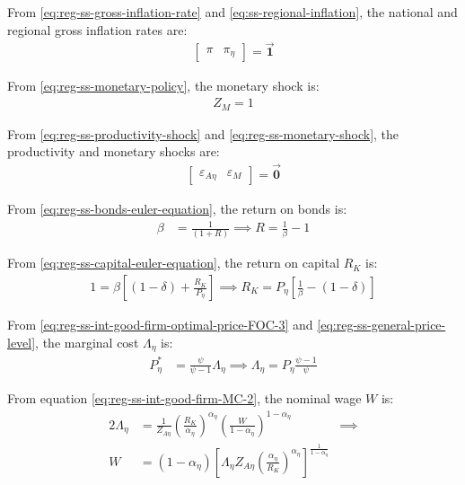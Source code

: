 \documentclass[
thesis.tex
]{subfiles}
\begin{document}
From \ref{eq:reg-ss-gross-inflation-rate} and \ref{eq:ss-regional-inflation}, the national and regional gross inflation rates are:
\begin{align}
	\begin{bmatrix}
		\pi & \pi_{\eta}
	\end{bmatrix} = \vec{\bm{1}}
\end{align}

From \ref{eq:reg-ss-monetary-policy}, the monetary shock is:
\begin{align}
	Z_{M} = 1
\end{align}

From \ref{eq:reg-ss-productivity-shock} and \ref{eq:reg-ss-monetary-shock}, the productivity and monetary shocks are:
\begin{align}
	\begin{bmatrix}
		\varepsilon_{A\eta} & \varepsilon_{M}
	\end{bmatrix} = \vec{\bm{0}}
\end{align}

From \ref{eq:reg-ss-bonds-euler-equation}, the return on bonds is:
\begin{align}
	\beta &= \frac{1}{(1 + R)} \implies R = \frac{1}{\beta} - 1
\end{align}

From \ref{eq:reg-ss-capital-euler-equation}, the return on capital $R_K$ is:
\begin{align}
	\label{eq:reg-ss-return-on-capital}
	1 = \beta \left[ (1-\delta) + \frac{R_K}{P_{\eta}} \right] \implies 
	R_K = P_{\eta} \left[ \frac{1}{\beta} - (1-\delta) \right]
\end{align}

From \ref{eq:reg-ss-int-good-firm-optimal-price-FOC-3} and \ref{eq:reg-ss-general-price-level}, the marginal cost $\Lambda_{\eta}$ is:
\begin{align}
	P_{\eta}^\ast &= \frac{\psi}{\psi-1} \Lambda_{\eta} \implies \Lambda_{\eta} = P_{\eta} \frac{\psi-1}{\psi} \label{eq:reg-ss-marginal-cost}
\end{align}

From equation \ref{eq:reg-ss-int-good-firm-MC-2}, the nominal wage $W$ is:
\begin{alignat}{2}
	\Lambda_{\eta} &= \frac{1}{Z_{A\eta}} \left( \frac{R_K}{{\alpha_\eta}} \right)^{{\alpha_\eta}} \left( \frac{W}{1-{\alpha_\eta}} \right)^{1-{\alpha_\eta}} &\implies \nonumber \\ 
	W &= (1-{\alpha_\eta}) \left[ \Lambda_{\eta} Z_{A\eta} \left( \frac{{\alpha_\eta}}{R_K} \right)^{{\alpha_\eta}} \right]^\frac{1}{1-{\alpha_\eta}} &\, \label{eq:reg-ss-nominal-wage}
\end{alignat}
\end{document}
